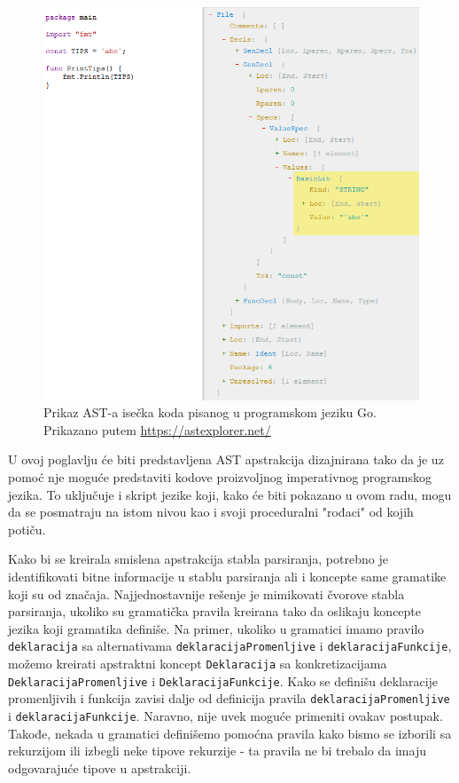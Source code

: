 \begin{figure}[h!]
    \centering
        \includegraphics[scale=0.7]{images/ast_go.png}
    \caption{Prikaz AST-a isečka koda pisanog u programskom jeziku Go. Prikazano putem \url{https://astexplorer.net/}}
    \label{fig:ASTLua}
\end{figure}

U ovoj poglavlju će biti predstavljena AST apstrakcija dizajnirana tako da je uz pomoć nje moguće predstaviti kodove proizvoljnog imperativnog programskog jezika. To uključuje i skript jezike koji, kako će biti pokazano u ovom radu, mogu da se posmatraju na istom nivou kao i svoji proceduralni "rođaci" od kojih potiču.

Kako bi se kreirala smislena apstrakcija stabla parsiranja, potrebno je identifikovati bitne informacije u stablu parsiranja ali i koncepte same gramatike koji su od značaja. Najjednostavnije rešenje je mimikovati čvorove stabla parsiranja, ukoliko su gramatička pravila kreirana tako da oslikaju koncepte jezika koji gramatika definiše. Na primer, ukoliko u gramatici imamo pravilo \texttt{deklaracija} sa alternativama \texttt{deklaracijaPromenljive} i \texttt{deklaracijaFunkcije}, možemo kreirati apstraktni koncept \texttt{Deklaracija} sa konkretizacijama \texttt{DeklaracijaPromenljive} i \texttt{DeklaracijaFunkcije}. Kako se definišu deklaracije promenljivih i funkcija zavisi dalje od definicija pravila \texttt{deklaracijaPromenljive} i \texttt{deklaracijaFunkcije}. Naravno, nije uvek moguće primeniti ovakav postupak. Takođe, nekada u gramatici definišemo pomoćna pravila kako bismo se izborili sa rekurzijom ili izbegli neke tipove rekurzije - ta pravila ne bi trebalo da imaju odgovarajuće tipove u apstrakciji. 

